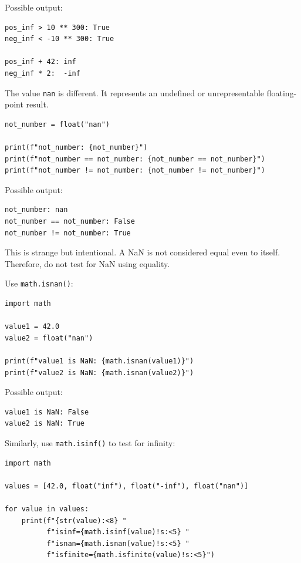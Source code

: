 Possible output:

\begin{verbatim}
pos_inf > 10 ** 300: True
neg_inf < -10 ** 300: True

pos_inf + 42: inf
neg_inf * 2:  -inf
\end{verbatim}

The value \texttt{nan} is different. It represents an undefined or unrepresentable floating-point result.

\begin{verbatim}
not_number = float("nan")

print(f"not_number: {not_number}")
print(f"not_number == not_number: {not_number == not_number}")
print(f"not_number != not_number: {not_number != not_number}")
\end{verbatim}

Possible output:

\begin{verbatim}
not_number: nan
not_number == not_number: False
not_number != not_number: True
\end{verbatim}

This is strange but intentional. A NaN is not considered equal even to itself. Therefore, do not test for NaN using equality.

Use \texttt{math.isnan()}:

\begin{verbatim}
import math

value1 = 42.0
value2 = float("nan")

print(f"value1 is NaN: {math.isnan(value1)}")
print(f"value2 is NaN: {math.isnan(value2)}")
\end{verbatim}

Possible output:

\begin{verbatim}
value1 is NaN: False
value2 is NaN: True
\end{verbatim}

Similarly, use \texttt{math.isinf()} to test for infinity:

\begin{verbatim}
import math

values = [42.0, float("inf"), float("-inf"), float("nan")]

for value in values:
    print(f"{str(value):<8} "
          f"isinf={math.isinf(value)!s:<5} "
          f"isnan={math.isnan(value)!s:<5} "
          f"isfinite={math.isfinite(value)!s:<5}")
\end{verbatim}

